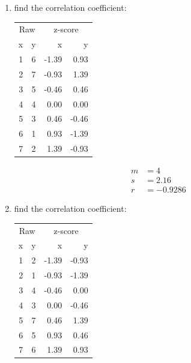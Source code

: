 \documentclass[landscape]{exam}
\begin{document}
  \begin{enumerate}
    \item find the correlation coefficient:
      \begin{table}[ht]
      \centering
      \begin{tabular}{rrrr}
        \toprule
        \multicolumn{2}{c}{Raw} & \multicolumn{2}{c}{z-score } \\
        \cmidrule(r){1-2} \cmidrule(r){3-4} 
        x & y & x     & y \\
        \midrule
        1 & 6 & -1.39 & 0.93 \\
        2 & 7 & -0.93 & 1.39 \\
        3 & 5 & -0.46 & 0.46 \\
        4 & 4 & 0.00  & 0.00 \\
        5 & 3 & 0.46  & -0.46 \\
        6 & 1 & 0.93  & -1.39 \\
        7 & 2 & 1.39  & -0.93 \\
        \bottomrule
      \end{tabular}
      \end{table}

    \begin{solution}
      \begin{align*}
        m &= 4 \\
        s &= 2.16 \\
        r &= -0.9286
      \end{align*}
    \end{solution}

    \item find the correlation coefficient:
      \begin{table}[ht]
      \centering
      \begin{tabular}{rrrr}
        \toprule
        \multicolumn{2}{c}{Raw} & \multicolumn{2}{c}{z-score } \\
        \cmidrule(r){1-2} \cmidrule(r){3-4} 
        x & y & x     & y \\
        \midrule
        1 & 2 & -1.39 & -0.93 \\ 
        2 & 1 & -0.93 & -1.39 \\ 
        3 & 4 & -0.46 & 0.00 \\ 
        4 & 3 & 0.00 & -0.46 \\ 
        5 & 7 & 0.46 & 1.39 \\ 
        6 & 5 & 0.93 & 0.46 \\ 
        7 & 6 & 1.39 & 0.93 \\ 
        \bottomrule
      \end{tabular}
      \end{table}


\end{enumerate}
\end{document}

